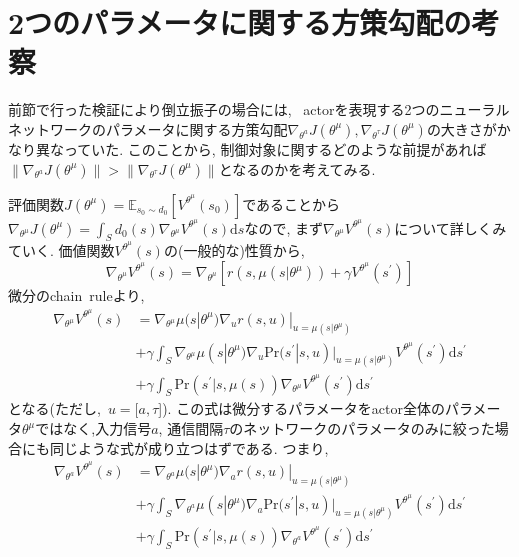 \documentclass{jsarticle}
\newcommand{\expect}{\mathbb{E}}
\begin{document}
\section{2つのパラメータに関する方策勾配の考察}
前節で行った検証により倒立振子の場合には, ~actorを表現する2つのニューラルネットワークのパラメータに関する方策勾配$\nabla_{\theta^a}J(\theta^{\mu}), \nabla_{\theta^{\tau}}J(\theta^{\mu})$の大きさがかなり異なっていた. このことから, 制御対象に関するどのような前提があれば$\|\nabla_{\theta^a}J(\theta^{\mu})\|>\|\nabla_{\theta^{\tau}}J(\theta^{\mu})\|$となるのかを考えてみる.\par
評価関数$J(\theta^{\mu})=\expect_{s_0\sim d_0}[V^{\theta^{\mu}}(s_0)]$であることから$\nabla_{\theta^{\mu}}J(\theta^{\mu})=\int_{S}d_0(s)\nabla_{\theta^{\mu}}V^{\theta^{\mu}}(s)\textrm{d}s$なので, まず$\nabla_{\theta^{\mu}}V^{\theta^{\mu}}(s)$について詳しくみていく. 価値関数$V^{\theta^{\mu}}(s)$の(一般的な)性質から, 
\begin{equation}
	\nabla_{\theta^{\mu}}V^{\theta^{\mu}}(s) = \nabla_{\theta^{\mu}}[r(s, \mu(s|\theta^{\mu}))+\gamma V^{\theta^{\mu}}(s^{\prime})]
\end{equation}
微分のchain~ruleより,
\begin{align}
	\nabla_{\theta^{\mu}}V^{\theta^{\mu}}(s) &= \nabla_{\theta^{\mu}}\mu(s|\theta^{\mu})\nabla_ur(s, u)|_{u=\mu(s|\theta^{\mu})}\nonumber\\
	&+\gamma\int_{S}\nabla_{\theta^{\mu}}\mu(s|\theta^{\mu})\nabla_{u}\textrm{Pr}(s^{\prime}|s, u)|_{u=\mu(s|\theta^{\mu})}V^{\theta^{\mu}}(s^{\prime})\textrm{d}s^{\prime}\nonumber\\
	&+\gamma\int_{S}\textrm{Pr}(s^{\prime}|s, \mu(s))\nabla_{\theta^{\mu}}V^{\theta^{\mu}}(s^{\prime})\textrm{d}s^{\prime} \label{recurrence}
\end{align}
となる(ただし,~$u=[a,\tau$]). この式は微分するパラメータをactor全体のパラメータ$\theta^{\mu}$ではなく,入力信号$a$, 通信間隔$\tau$のネットワークのパラメータのみに絞った場合にも同じような式が成り立つはずである. つまり,
\begin{align}
	\nabla_{\theta^{a}}V^{\theta^{\mu}}(s) &= \nabla_{\theta^{a}}\mu(s|\theta^{\mu})\nabla_{a}r(s, u)|_{u=\mu(s|\theta^{\mu})}\nonumber\\
	&+\gamma\int_{S}\nabla_{\theta^{a}}\mu(s|\theta^{\mu})\nabla_{a}\textrm{Pr}(s^{\prime}|s, u)|_{u=\mu(s|\theta^{\mu})}V^{\theta^{\mu}}(s^{\prime})\textrm{d}s^{\prime}\nonumber\\
	&+\gamma\int_{S}\textrm{Pr}(s^{\prime}|s, \mu(s))\nabla_{\theta^{a}}V^{\theta^{\mu}}(s^{\prime})\textrm{d}s^{\prime} \label{recurrence_a}
\end{align}
\end{document}
